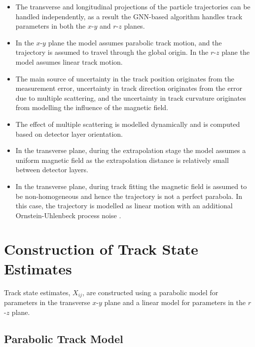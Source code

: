 \begin{itemize}
    \item The transverse and longitudinal projections of the particle trajectories can be handled independently, as a result the GNN-based algorithm handles track parameters in both the $x$-$y$ and $r$-$z$ planes. 
    \item In the $x$-$y$ plane the model assumes parabolic track motion, and the trajectory is assumed to travel through the global origin. In the $r$-$z$ plane the model assumes linear track motion.
    \item The main source of uncertainty in the track position originates from the measurement error, uncertainty in track direction originates from the error due to multiple scattering, and the uncertainty in track curvature originates from modelling the influence of the magnetic field.
    \item The effect of multiple scattering is modelled dynamically and is computed based on detector layer orientation.
    \item In the transverse plane, during the extrapolation stage the model assumes a uniform magnetic field as the extrapolation distance is relatively small between detector layers.
    \item In the transverse plane, during track fitting the magnetic field is assumed to be non-homogeneous and hence the trajectory is not a perfect parabola. In this case, the trajectory is modelled as linear motion with an additional Ornstein-Uhlenbeck process noise \cite{OU}.

\end{itemize}


\section{Construction of Track State Estimates}
\label{constructing-track-states}

Track state estimates, $X_{ij}$, are constructed using a parabolic model for parameters in the transverse $x$-$y$ plane and a linear model for parameters in the $r$-$z$ plane.



\subsection{Parabolic Track Model}
\label{parabolic-state}

